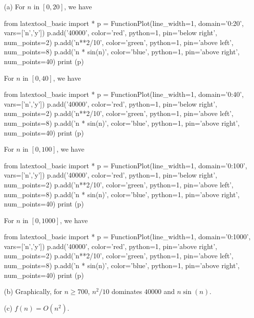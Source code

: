 (a)
For $n$ in $[0,20]$, we have
\begin{python}
from latextool_basic import *
p = FunctionPlot(line_width=1, domain='0:20', vars=['n','y'])
p.add('40000', color='red', python=1, pin='below right', num_points=2)
p.add('n**2/10', color='green', python=1, pin='above left', num_points=8)
p.add('n * sin(n)', color='blue', python=1, pin='above right', num_points=40)
print (p)
\end{python}
For $n$ in $[0,40]$, we have
\begin{python}
from latextool_basic import *
p = FunctionPlot(line_width=1, domain='0:40', vars=['n','y'])
p.add('40000', color='red', python=1, pin='below right', num_points=2)
p.add('n**2/10', color='green', python=1, pin='above left', num_points=8)
p.add('n * sin(n)', color='blue', python=1, pin='above right', num_points=40)
print (p)
\end{python}
For $n$ in $[0,100]$, we have
\begin{python}
from latextool_basic import *
p = FunctionPlot(line_width=1, domain='0:100', vars=['n','y'])
p.add('40000', color='red', python=1, pin='below right', num_points=2)
p.add('n**2/10', color='green', python=1, pin='above left', num_points=8)
p.add('n * sin(n)', color='blue', python=1, pin='above right', num_points=40)
print (p)
\end{python}
For $n$ in $[0,1000]$, we have
\begin{python}
from latextool_basic import *
p = FunctionPlot(line_width=1, domain='0:1000', vars=['n','y'])
p.add('40000', color='red', python=1, pin='above right', num_points=2)
p.add('n**2/10', color='green', python=1, pin='above left', num_points=8)
p.add('n * sin(n)', color='blue', python=1, pin='above right', num_points=40)
print (p)
\end{python}

(b)
Graphically,
for $n \geq 700$, $n^2/10$ dominates $40000$ and $n \sin (n)$.

(c)
$f(n) = O(n^2)$.
